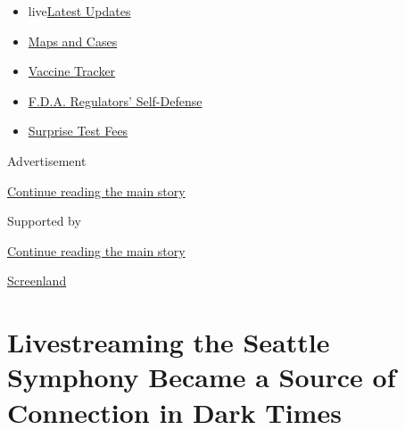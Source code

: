 \begin{itemize}
\tightlist
\item
  live\href{https://www.nytimes3xbfgragh.onion/2020/09/12/world/covid-19-coronavirus.html?name=styln-coronavirus-national\&region=TOP_BANNER\&block=storyline_menu_recirc\&action=click\&pgtype=Article\&impression_id=f2d49421-f52e-11ea-b9b1-3dadc7cfc0e9\&variant=undefined}{Latest
  Updates}
\item
  \href{https://www.nytimes3xbfgragh.onion/interactive/2020/us/coronavirus-us-cases.html?name=styln-coronavirus-national\&region=TOP_BANNER\&block=storyline_menu_recirc\&action=click\&pgtype=Article\&impression_id=f2d4bb30-f52e-11ea-b9b1-3dadc7cfc0e9\&variant=undefined}{Maps
  and Cases}
\item
  \href{https://www.nytimes3xbfgragh.onion/interactive/2020/science/coronavirus-vaccine-tracker.html?name=styln-coronavirus-national\&region=TOP_BANNER\&block=storyline_menu_recirc\&action=click\&pgtype=Article\&impression_id=f2d4bb31-f52e-11ea-b9b1-3dadc7cfc0e9\&variant=undefined}{Vaccine
  Tracker}
\item
  \href{https://www.nytimes3xbfgragh.onion/2020/09/10/us/politics/fda-coronavirus-vaccine.html?name=styln-coronavirus-national\&region=TOP_BANNER\&block=storyline_menu_recirc\&action=click\&pgtype=Article\&impression_id=f2d4bb32-f52e-11ea-b9b1-3dadc7cfc0e9\&variant=undefined}{F.D.A.
  Regulators' Self-Defense}
\item
  \href{https://www.nytimes3xbfgragh.onion/2020/09/09/upshot/coronavirus-surprise-test-fees.html?name=styln-coronavirus-national\&region=TOP_BANNER\&block=storyline_menu_recirc\&action=click\&pgtype=Article\&impression_id=f2d4bb33-f52e-11ea-b9b1-3dadc7cfc0e9\&variant=undefined}{Surprise
  Test Fees}
\end{itemize}

Advertisement

\protect\hyperlink{after-top}{Continue reading the main story}

Supported by

\protect\hyperlink{after-sponsor}{Continue reading the main story}

\href{/column/screenland}{Screenland}

\hypertarget{livestreaming-the-seattle-symphony-became-a-source-of-connection-in-dark-times}{%
\section{Livestreaming the Seattle Symphony Became a Source of
Connection in Dark
Times}\label{livestreaming-the-seattle-symphony-became-a-source-of-connection-in-dark-times}}

